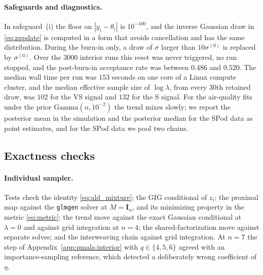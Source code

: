 \paragraph{Safeguards and diagnostics.} In safeguard~(i) the floor on $|y_i - \theta_i|$ is $10^{-100}$, and the inverse Gaussian draw in \eqref{eq:zupdate} is computed in a form that avoids cancellation and has the same distribution. During the burn-in only, a draw of $\sigma$ larger than $10\sigma^{(0)}$ is replaced by $\sigma^{(0)}$. Over the $3000$ interior runs this reset was never triggered, no run stopped, and the post-burn-in acceptance rate was between $0.486$ and $0.520$. The median wall time per run was $153$ seconds on one core of a Linux compute cluster, and the median effective sample size of $\log\lambda$, from every $30$th retained draw, was $102$ for the VS signal and $132$ for the S signal. For the air-quality fits under the prior $\mathrm{Gamma}(n, 10^{-2})$ the trend mixes slowly; we report the posterior mean in the simulation and the posterior median for the SPod data as point estimates, and for the SPod data we pool two chains.

\subsection{Exactness checks}
\label{app:pmala:tests}

\paragraph{Individual sampler.} Tests check the identity \eqref{eq:ald_mixture}; the GIG conditional of $z_i$; the proximal map against the \texttt{glmgen} solver \citep{tibshirani2014adaptive} at $M = \mathbf{I}_n$, and its minimizing property in the metric \eqref{eq:metric}; the trend move against the exact Gaussian conditional at $\lambda = 0$ and against grid integration at $n = 4$; the shared-factorization move against separate solves; and the interweaving chain against grid integration. At $n = 7$ the step of Appendix~\ref{app:pmala:interior} with $q \in \{4, 5, 6\}$ agreed with an importance-sampling reference, which detected a deliberately wrong coefficient of $\eta$.

